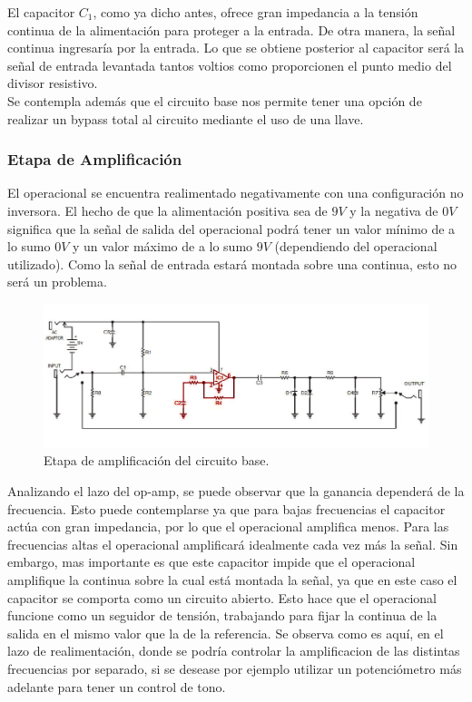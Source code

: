 El capacitor $C_1$, como ya dicho antes, ofrece gran impedancia a la tensión continua de la alimentación para proteger a la entrada. De otra manera, la señal continua ingresaría por la entrada.
Lo que se obtiene posterior al capacitor será la señal de entrada levantada tantos voltios como proporcionen el punto medio del divisor resistivo.\\

Se contempla además que el circuito base nos permite tener una opción de realizar un bypass total al circuito mediante el uso de una llave.

\subsubsection{Etapa de Amplificación}

El operacional se encuentra realimentado negativamente con una configuración no inversora. El hecho de que la alimentación positiva sea de $9V$ y la negativa de $0V$ significa que la señal de salida del operacional podrá tener un valor mínimo de a lo sumo $0V$ y un valor máximo de a lo sumo $9V$ (dependiendo del operacional utilizado). Como la señal de entrada estará montada sobre una continua, esto no será un problema.

\begin{figure}[H]
	\centering
	\includegraphics[width=1\textwidth, trim={0 0 0 0}, clip]{Ejercicio5/Imagenes/Circuito_base/circuito_base_amplificacion.png}
	\caption{Etapa de amplificación del circuito base.}
	\label{fig:circuito_base_amplificacion}
\end{figure}

Analizando el lazo del op-amp, se puede observar que la ganancia dependerá de la frecuencia.
Esto puede contemplarse ya que para bajas frecuencias el capacitor actúa con gran impedancia, por lo que el operacional amplifica menos. Para las frecuencias altas el operacional amplificará idealmente cada vez más la señal. Sin embargo, mas importante es que este capacitor impide que el operacional amplifique la continua sobre la cual está montada la señal, ya que en este caso el capacitor se comporta como un circuito abierto. Esto hace que el operacional funcione como un seguidor de tensión, trabajando para fijar la continua de la salida en el mismo valor que la de la referencia. Se observa como es aquí, en el lazo de realimentación, donde se podría controlar la amplificacion de las distintas frecuencias por separado, si se desease por ejemplo utilizar un potenciómetro más adelante para tener un control de tono.

